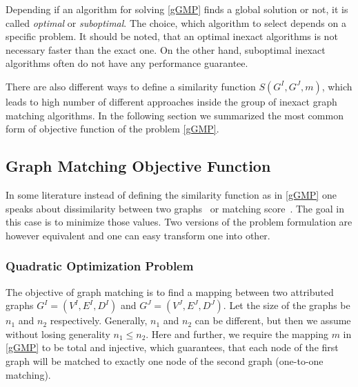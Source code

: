 Depending if an algorithm for solving \eqref{gGMP} finds a global solution or not, it is called \emph{optimal} or \emph{suboptimal}. The choice, which algorithm to select depends on a specific problem. It should be noted, that an optimal inexact algorithms is not necessary faster than the exact one. On the other hand, suboptimal inexact algorithms often do not have any performance guarantee.

There are also different ways to define a similarity function $S(G^I,G^J,m)$, which leads to high number of different approaches inside the group of inexact graph matching algorithms. In the following section we summarized the most common form of objective function of the problem \eqref{gGMP}.

\subsection{Graph Matching Objective Function}

In some literature instead of defining the similarity function as in \eqref{gGMP} one speaks about dissimilarity between two graphs~ or matching score~. The goal in this case is to minimize those values. Two versions of the problem formulation are however equivalent and one can easy transform one into other.

\subsubsection{Quadratic Optimization Problem}
The objective of graph matching is to find a mapping between two attributed graphs $G^I = (V^I, E^I,D^I)$ and $G^J = (V^J, E^J,D^J)$. Let the size of the graphs be $n_1$ and $n_2$ respectively. Generally, $n_1$ and $n_2$ can be different, but then we assume without losing generality $n_1\le n_2$. Here and further, we require the mapping $m$ in \eqref{gGMP} to be total and injective, which guarantees, that each node of the first graph will be matched to exactly one node of the second graph (one-to-one matching). 

